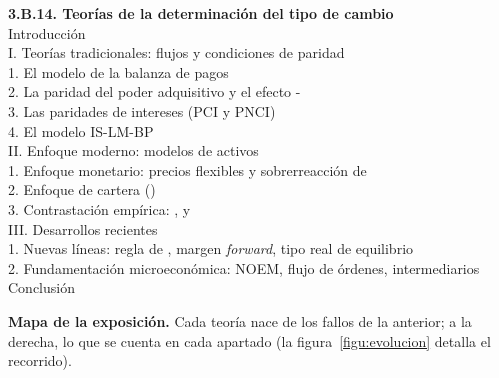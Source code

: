 \documentclass[11pt]{article}
\begin{document}
\begin{esquema}
\textbf{3.B.14. Teorías de la determinación del tipo de cambio}\\[2pt]
Introducción\\
I. Teorías tradicionales: flujos y condiciones de paridad\\
\hspace*{1.5em}1. El modelo de la balanza de pagos\\
\hspace*{1.5em}2. La paridad del poder adquisitivo y el efecto -\\
\hspace*{1.5em}3. Las paridades de intereses (PCI y PNCI)\\
\hspace*{1.5em}4. El modelo IS-LM-BP\\
II. Enfoque moderno: modelos de activos\\
\hspace*{1.5em}1. Enfoque monetario: precios flexibles y sobrerreacción de \\
\hspace*{1.5em}2. Enfoque de cartera ()\\
\hspace*{1.5em}3. Contrastación empírica: ,  y \\
III. Desarrollos recientes\\
\hspace*{1.5em}1. Nuevas líneas: regla de , margen \emph{forward}, tipo real de equilibrio\\
\hspace*{1.5em}2. Fundamentación microeconómica: NOEM, flujo de órdenes, intermediarios\\
Conclusión
\end{esquema}

\begin{anotaciones}
\textbf{Mapa de la exposición.} Cada teoría nace de los fallos de la anterior; a la derecha, lo que se cuenta en cada apartado (la figura~\ref{figu:evolucion} detalla el recorrido).
\begin{infografiacaja}
\caption{Mapa del tema: la pregunta de cada bloque, sus apartados y el hilo que los une}\label{figu:mapa-tema}
\end{infografiacaja}
\end{anotaciones}
\end{document}

